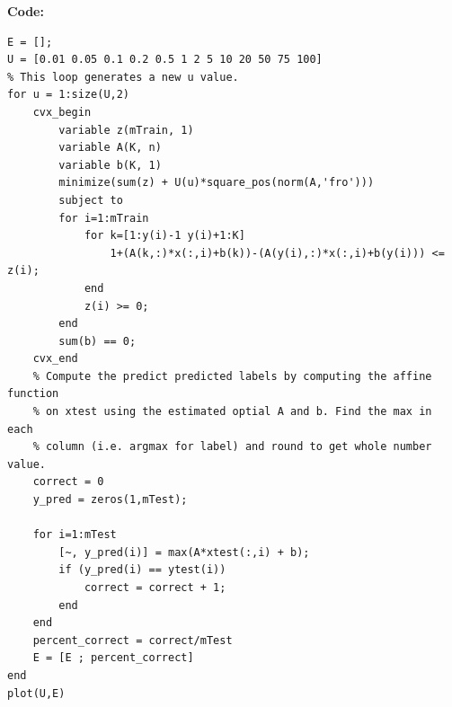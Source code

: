 \documentclass[12pt]{article}
\begin{document}
\textbf{Code:}\\
\begin{lstlisting}
E = [];
U = [0.01 0.05 0.1 0.2 0.5 1 2 5 10 20 50 75 100]
% This loop generates a new u value. 
for u = 1:size(U,2)
    cvx_begin
        variable z(mTrain, 1)
        variable A(K, n)
        variable b(K, 1)
        minimize(sum(z) + U(u)*square_pos(norm(A,'fro')))
        subject to
        for i=1:mTrain
            for k=[1:y(i)-1 y(i)+1:K]
                1+(A(k,:)*x(:,i)+b(k))-(A(y(i),:)*x(:,i)+b(y(i))) <= z(i);
            end
            z(i) >= 0;
        end
        sum(b) == 0;
    cvx_end
    % Compute the predict predicted labels by computing the affine function
    % on xtest using the estimated optial A and b. Find the max in each
    % column (i.e. argmax for label) and round to get whole number value.
    correct = 0
    y_pred = zeros(1,mTest);

    for i=1:mTest
        [~, y_pred(i)] = max(A*xtest(:,i) + b);
        if (y_pred(i) == ytest(i))
            correct = correct + 1;
        end
    end
    percent_correct = correct/mTest
    E = [E ; percent_correct]    
end
plot(U,E)
\end{lstlisting}
\end{document}
